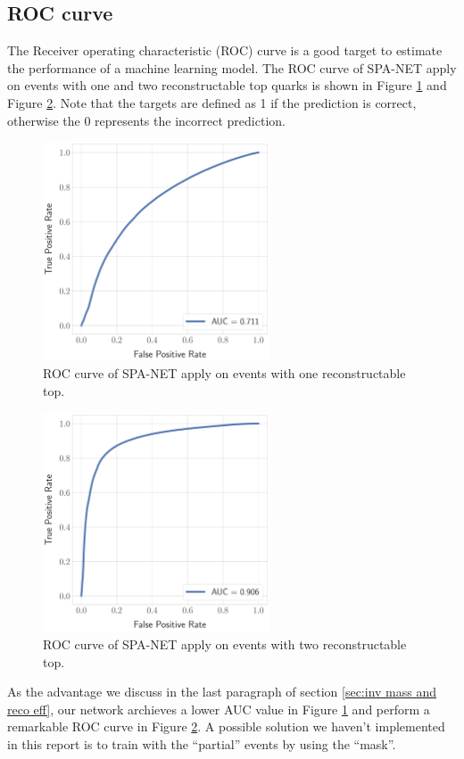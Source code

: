 \subsection{ROC curve}\label{sebsec:roc}
The Receiver operating characteristic (ROC) curve is a good target to estimate the performance of a machine learning model. The ROC curve of SPA-NET apply on events with one and two reconstructable top quarks is shown in Figure \ref{fig: roc one top} and Figure \ref{fig: roc two top}. Note that the targets are defined as 1 if the prediction is correct, otherwise the 0 represents the incorrect prediction.
\\
 \begin{figure}[H]
 	\centering
 	\includegraphics[width=0.6\textwidth]{Figures/roc_one_quark.pdf}
 	\caption{ ROC curve of SPA-NET apply on events with one reconstructable top.}
 	\label{fig: roc one top}
 \end{figure}
 \begin{figure}[H]
 	\centering
 	\includegraphics[width=0.6\textwidth]{Figures/roc_two_quark.pdf}
 	\caption{ ROC curve of SPA-NET apply on events with two reconstructable top.}
 	\label{fig: roc two top}
 \end{figure}
\newpage
As the advantage we discuss in the last paragraph of section \ref{sec:inv mass and reco eff}, our network archieves a lower AUC value in Figure \ref{fig: roc one top} and perform a remarkable ROC curve in Figure \ref{fig: roc two top}. A possible solution we haven't implemented in this report is to train with the ``partial'' events by using the ``mask''.\cite{Fenton:2020woz}\cite{Shmakov:2021qdz}
